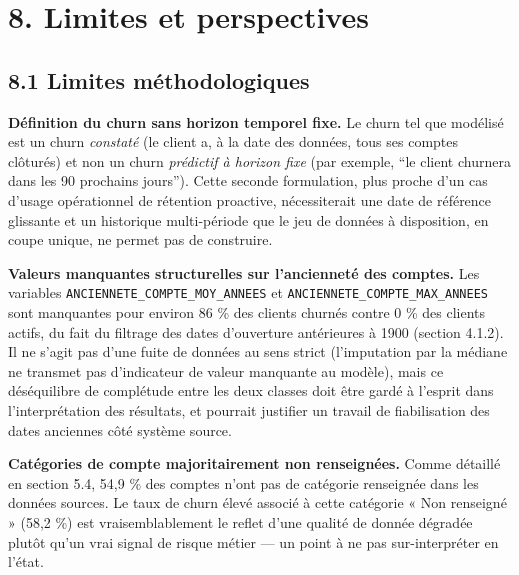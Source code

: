 \documentclass[11pt,a4paper]{article}
\begin{document}
\newpage

\hypertarget{limites-et-perspectives}{%
\section{8. Limites et perspectives}\label{limites-et-perspectives}}

\hypertarget{limites-muxe9thodologiques}{%
\subsection{8.1 Limites
méthodologiques}\label{limites-muxe9thodologiques}}

\textbf{Définition du churn sans horizon temporel fixe.} Le churn tel
que modélisé est un churn \emph{constaté} (le client a, à la date des
données, tous ses comptes clôturés) et non un churn \emph{prédictif à
horizon fixe} (par exemple, ``le client churnera dans les 90 prochains
jours''). Cette seconde formulation, plus proche d'un cas d'usage
opérationnel de rétention proactive, nécessiterait une date de référence
glissante et un historique multi-période que le jeu de données à
disposition, en coupe unique, ne permet pas de construire.

\textbf{Valeurs manquantes structurelles sur l'ancienneté des comptes.}
Les variables
\texttt{ANCIENNETE\_\hspace{0pt}COMPTE\_\hspace{0pt}MOY\_\hspace{0pt}ANNEES}
et
\texttt{ANCIENNETE\_\hspace{0pt}COMPTE\_\hspace{0pt}MAX\_\hspace{0pt}ANNEES}
sont manquantes pour environ 86 \% des clients churnés contre 0 \% des
clients actifs, du fait du filtrage des dates d'ouverture antérieures à
1900 (section 4.1.2). Il ne s'agit pas d'une fuite de données au sens
strict (l'imputation par la médiane ne transmet pas d'indicateur de
valeur manquante au modèle), mais ce déséquilibre de complétude entre
les deux classes doit être gardé à l'esprit dans l'interprétation des
résultats, et pourrait justifier un travail de fiabilisation des dates
anciennes côté système source.

\textbf{Catégories de compte majoritairement non renseignées.} Comme
détaillé en section 5.4, 54,9 \% des comptes n'ont pas de catégorie
renseignée dans les données sources. Le taux de churn élevé associé à
cette catégorie « Non renseigné » (58,2 \%) est vraisemblablement le
reflet d'une qualité de donnée dégradée plutôt qu'un vrai signal de
risque métier --- un point à ne pas sur-interpréter en l'état.
\end{document}
